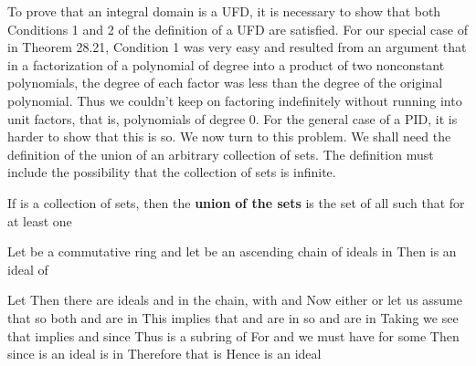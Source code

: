 \documentclass[11pt,oneside]{article}
\begin{document}
\begin{BookBody}

To prove that an integral domain  is a UFD, it is necessary to show that both Conditions 1 and 2 of the definition of a UFD are satisfied. For our special case of  in Theorem 28.21, Condition 1 was very easy and resulted from an argument that in a factorization of a polynomial of degree  into a product of two nonconstant polynomials, the degree of each factor was less than the degree of the original polynomial. Thus we couldn’t keep on factoring indefinitely without running into unit factors, that is, polynomials of degree 0. For the general case of a PID, it is harder to show that this is so. We now turn to this problem. We shall need the definition of the union of an arbitrary collection of sets. The definition must include the possibility that the collection of sets is infinite.

 If  is a collection of sets, then the\textbf{ union}  \textbf{of the sets}  is the set of all  such that  for at least one \BookEnd{\blacksquare}

 Let  be a commutative ring and let  be an ascending chain of ideals  in  Then  is an ideal of 

 Let  Then there are ideals  and  in the chain, with  and  Now either  or  let us assume that  so both  and  are in  This implies that  and  are in  so  and  are in  Taking  we see that  implies  and  since  Thus  is a subring of  For  and  we must have  for some  Then since  is an ideal is in  Therefore that is Hence  is an ideal\BookEnd{\blacklozenge}


\end{BookBody}
\end{document}
